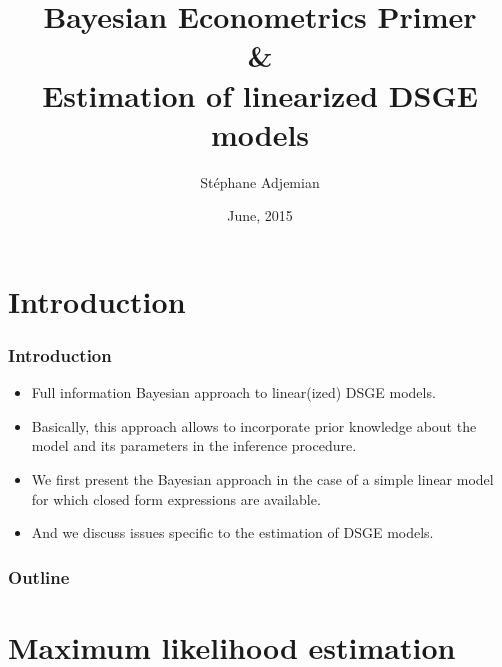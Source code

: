 \documentclass[10pt,slidestop]{beamer}
\begin{document}
\title{Bayesian Econometrics Primer\\ \& \\ Estimation of linearized
  DSGE models}
\author[S. Adjemian]{St\'ephane Adjemian}
\date{June, 2015}

\begin{frame}
  \titlepage{}
\end{frame}

\section{Introduction}

\begin{frame}
  \frametitle{Introduction}
  \begin{itemize}
    \item Full information Bayesian approach to linear(ized) DSGE models.
    \item Basically, this approach allows to incorporate prior
      knowledge about the model and its parameters in the inference
      procedure.
    \item We first present the Bayesian approach in the case of a simple
      linear model for which closed form expressions are available.
    \item And we discuss issues specific to the estimation of DSGE models.
  \end{itemize}
\end{frame}


\begin{frame}
    \frametitle{Outline}
    \tableofcontents
  \end{frame}

\section{Maximum likelihood estimation}
\end{document}
